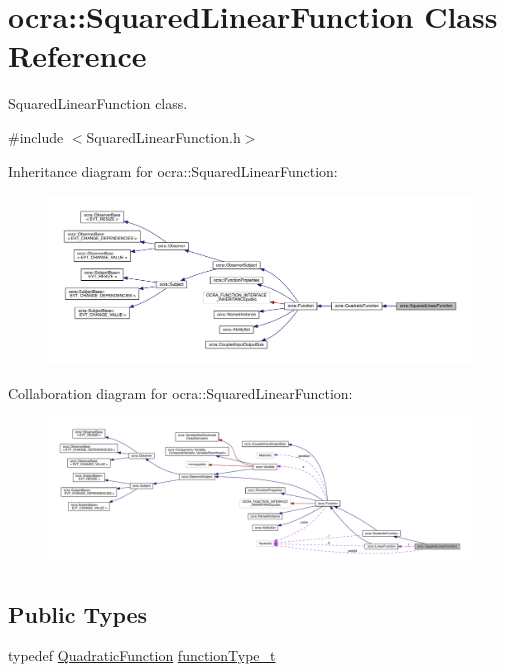 \hypertarget{classocra_1_1SquaredLinearFunction}{}\section{ocra\+:\+:Squared\+Linear\+Function Class Reference}
\label{classocra_1_1SquaredLinearFunction}


Squared\+Linear\+Function class.  




{\ttfamily \#include $<$Squared\+Linear\+Function.\+h$>$}



Inheritance diagram for ocra\+:\+:Squared\+Linear\+Function\+:\nopagebreak
\begin{figure}[H]
\begin{center}
\leavevmode
\includegraphics[width=350pt]{d7/d86/classocra_1_1SquaredLinearFunction__inherit__graph}
\end{center}
\end{figure}


Collaboration diagram for ocra\+:\+:Squared\+Linear\+Function\+:\nopagebreak
\begin{figure}[H]
\begin{center}
\leavevmode
\includegraphics[width=350pt]{d2/d85/classocra_1_1SquaredLinearFunction__coll__graph}
\end{center}
\end{figure}
\subsection*{Public Types}
\begin{DoxyCompactItemize}
\item 
typedef \hyperlink{classocra_1_1QuadraticFunction}{Quadratic\+Function} \hyperlink{classocra_1_1SquaredLinearFunction_a7f1e0d7cfae65a8111bf6615f8c24f19}{function\+Type\+\_\+t}
\end{DoxyCompactItemize}
